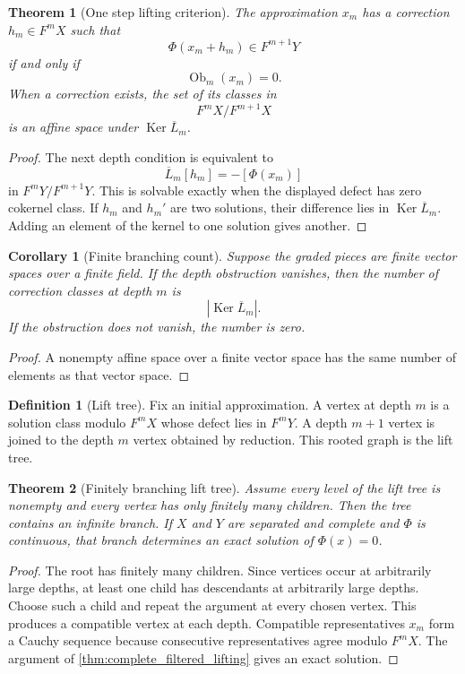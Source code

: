 \documentclass{aomart}
\newtheorem{theorem}{Theorem}[section]
\newtheorem{corollary}[corollary]{Corollary}
\theoremstyle{definition}
\newtheorem{definition}[definition]{Definition}
\theoremstyle{remark}
\newcommand{\Ker}{\operatorname{Ker}}
\newcommand{\Ob}{\operatorname{Ob}}
\begin{document}
\begin{theorem}[One step lifting criterion]\label{thm:one_step_lifting}
The approximation $x_m$ has a correction $h_m\in F^mX$ such that
\[
\Phi(x_m+h_m)\in F^{m+1}Y
\]
if and only if
\[
\Ob_m(x_m)=0.
\]
When a correction exists, the set of its classes in
\[
F^mX/F^{m+1}X
\]
is an affine space under $\Ker\overline L_m$.
\end{theorem}

\begin{proof}
The next depth condition is equivalent to
\[
\overline L_m[h_m]
=-[\Phi(x_m)]
\]
in $F^mY/F^{m+1}Y$.  This is solvable exactly when the displayed defect has zero cokernel class.  If $h_m$ and $h_m'$ are two solutions, their difference lies in $\Ker\overline L_m$.  Adding an element of the kernel to one solution gives another.
\end{proof}

\begin{corollary}[Finite branching count]\label{cor:finite_branch_count}
Suppose the graded pieces are finite vector spaces over a finite field.  If the depth obstruction vanishes, then the number of correction classes at depth $m$ is
\[
|\Ker\overline L_m|.
\]
If the obstruction does not vanish, the number is zero.
\end{corollary}

\begin{proof}
A nonempty affine space over a finite vector space has the same number of elements as that vector space.
\end{proof}


\begin{definition}[Lift tree]\label{def:lift_tree}
Fix an initial approximation.  A vertex at depth $m$ is a solution class modulo $F^mX$ whose defect lies in $F^mY$.  A depth $m+1$ vertex is joined to the depth $m$ vertex obtained by reduction.  This rooted graph is the lift tree.
\end{definition}

\begin{theorem}[Finitely branching lift tree]\label{thm:finitely_branching_lift_tree}
Assume every level of the lift tree is nonempty and every vertex has only finitely many children.  Then the tree contains an infinite branch.  If $X$ and $Y$ are separated and complete and $\Phi$ is continuous, that branch determines an exact solution of $\Phi(x)=0$.
\end{theorem}

\begin{proof}
The root has finitely many children.  Since vertices occur at arbitrarily large depths, at least one child has descendants at arbitrarily large depths.  Choose such a child and repeat the argument at every chosen vertex.  This produces a compatible vertex at each depth.  Compatible representatives $x_m$ form a Cauchy sequence because consecutive representatives agree modulo $F^mX$.  The argument of \cref{thm:complete_filtered_lifting} gives an exact solution.
\end{proof}
\end{document}
